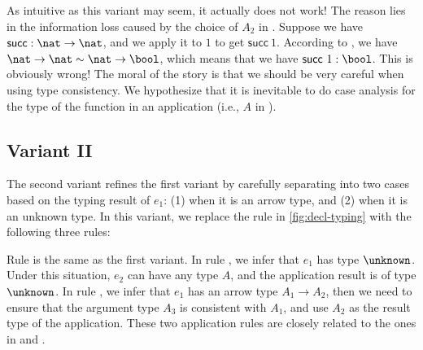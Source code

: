 As intuitive as this variant may seem, it actually does not work! The reason lies
in the information loss caused by the choice of $A_2$ in . Suppose
we have $\mathsf{succ} : \nat \to \nat$, and we apply it to $1$ to get
$\mathsf{succ}~{1}$. According to , we have $\nat \to \nat \sim \nat
\to \bool$, which means that we have $\mathsf{succ}~1 : \bool$. This is obviously
wrong! The moral of the story is that we should be very careful when using type consistency.
We hypothesize that it is inevitable to do case analysis for the type of the
function in an application (i.e., $A$ in ).


\subsection{Variant II}

The second variant refines the first variant by carefully separating
 into two cases based on the typing result of $e_1$: (1) when it is
an arrow type, and (2) when it is an unknown type. In this variant, we replace
the rule  in \cref{fig:decl-typing} with the following three rules:
\begin{mathpar}


\end{mathpar}
Rule  is the same as the first variant. In rule , we
infer that $e_1$ has type $\unknown$. Under this situation, $e_2$ can have any
type $A$, and the application result is of type $\unknown$. In rule
, we infer that $e_1$ has an arrow type $A_1 \to A_2$, then we need to
ensure that the argument type $A_3$ is consistent with $A_1$, and use $A_2$ as
the result type of the application. These two application rules are closely
related to the ones in \citet{siek2006gradual} and \citet{siek2007gradual}.

